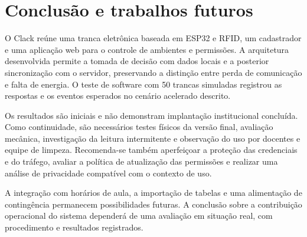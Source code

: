 \documentclass[12pt]{article}
\begin{document}
\section{Conclusão e trabalhos futuros}

O Clack reúne uma tranca eletrônica baseada em ESP32 e RFID, um cadastrador e uma aplicação web para o controle de ambientes e permissões. A arquitetura desenvolvida permite a tomada de decisão com dados locais e a posterior sincronização com o servidor, preservando a distinção entre perda de comunicação e falta de energia. O teste de software com 50 trancas simuladas registrou as respostas e os eventos esperados no cenário acelerado descrito.

Os resultados são iniciais e não demonstram implantação institucional concluída. Como continuidade, são necessários testes físicos da versão final, avaliação mecânica, investigação da leitura intermitente e observação do uso por docentes e equipe de limpeza. Recomenda-se também aperfeiçoar a proteção das credenciais e do tráfego, avaliar a política de atualização das permissões e realizar uma análise de privacidade compatível com o contexto de uso.

A integração com horários de aula, a importação de tabelas e uma alimentação de contingência permanecem possibilidades futuras. A conclusão sobre a contribuição operacional do sistema dependerá de uma avaliação em situação real, com procedimento e resultados registrados.

\nocite{cruzjunior2024,fornaciari2023,ifsulregulamento}
\clearpage


\end{document}
